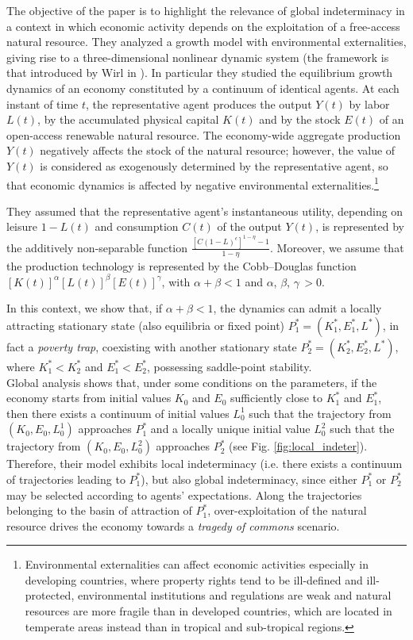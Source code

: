 The objective of the paper \cite{antoci_poverty_2011} is to highlight the relevance of global indeterminacy in a context in which economic activity depends on the exploitation of a free-access natural resource. They analyzed a growth model with environmental externalities, giving rise to a three-dimensional nonlinear dynamic system (the framework is that introduced by Wirl in \cite{wirl_stability_1997}). In particular they studied the equilibrium growth dynamics of an economy constituted by a continuum of identical agents. At each instant of time $t$, the representative agent produces the output $Y(t)$ by labor $L(t)$, by the accumulated physical capital $K(t)$ and by the stock $E(t)$ of an open-access renewable natural resource. The economy-wide aggregate production $Y(t)$ negatively affects the stock of the natural resource; however, the value of $Y(t)$ is considered as exogenously determined by the representative agent, so that economic dynamics is affected by negative environmental externalities.\footnote{Environmental externalities can affect economic activities especially in developing countries, where property rights tend to be ill-defined and ill-protected, environmental institutions and regulations are weak and natural resources are more fragile than in developed countries, which are located in temperate areas instead than in tropical and sub-tropical regions.}

They assumed that the representative agent’s instantaneous utility, depending on leisure $1-L(t)$ and consumption $C(t)$ of the output $Y(t)$, is represented by the additively non-separable function $\frac{[C(1-L)^{\epsilon}]^{1-\eta} -1}{1-\eta}$. Moreover, we assume that the production technology is represented by the Cobb–Douglas function $[K(t)]^\alpha [L(t)]^\beta [E(t)]^\gamma$, with $\alpha + \beta < 1$ and $\alpha$, $\beta$, $\gamma \,>0$. 

In this context, we show that, if $\alpha + \beta < 1$, the dynamics can admit a locally attracting stationary state (also equilibria or fixed point) $P_1^* = (K_1^*, E_1^*, L^*)$, in fact a \textit{poverty trap}, coexisting with another stationary state $P_2^* = (K_2^*,E_2^*,L^*)$, where $K_1^* < K_2^*$ and $E_1^* < E_2^*$, possessing saddle-point stability.\\ 
Global analysis shows that, under some conditions on the parameters, if the economy starts
from initial values $K_0$ and $E_0$ sufficiently close to $K_1^*$ and $E_1^*$, then there exists a continuum of initial values $L_0^1$ such that the trajectory from $(K_0,E_0,L_0^1)$ approaches $P_1^*$ and a locally unique initial value $L_0^2$ such that the trajectory from $(K_0,E_0,L_0^2)$ approaches $P_2^*$ (see Fig. \ref{fig:local_indeter}). Therefore, their model exhibits local indeterminacy (i.e. there exists a continuum of trajectories leading to $P_1^*$), but also global indeterminacy, since either $P_1^*$ or $P_2^*$ may be selected according to agents’ expectations. Along the trajectories belonging to the basin of attraction of $P_1^*$, over-exploitation
of the natural resource drives the economy towards a \textit{tragedy of commons} scenario.

